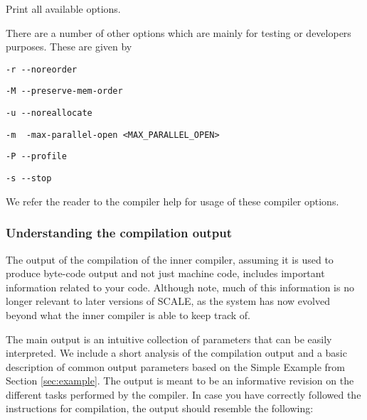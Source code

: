 Print all available options.

\vspace{5mm}
\noindent
There are a number of other options which are mainly for testing
or developers purposes. These are given by
\begin{description}
	\item \verb|-r --noreorder|
	\item \verb|-M --preserve-mem-order|
	\item \verb|-u --noreallocate|
	\item \verb|-m  -max-parallel-open <MAX_PARALLEL_OPEN>|
	\item \verb|-P --profile|
	\item \verb|-s --stop|
\end{description}
We refer the reader to the compiler help for usage of these compiler options.

\subsubsection{Understanding the compilation output}
The output of the compilation of the inner compiler, assuming it is used to produce byte-code output
and not just machine code, includes important information related to your code.
Although note, much of this information is no longer relevant to later versions of
SCALE, as the system has now evolved beyond what the inner compiler is able to
keep track of.

The main output is an intuitive collection of parameters that can be easily interpreted.
We include a short analysis of the compilation output and a basic description of common
output parameters based on the Simple Example from  Section \ref{sec:example}.
The output is meant to be an informative revision on the different tasks performed by
the compiler. In case you have correctly followed the instructions for compilation,
the output should resemble the following:

